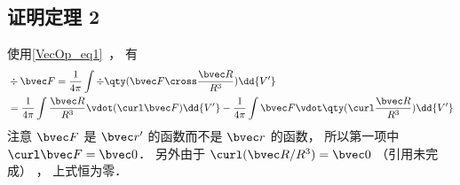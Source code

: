 \subsection{证明定理 2}
使用\autoref{VecOp_eq1}~， 有
\begin{equation}
\begin{aligned}
&\div \bvec F = \frac{1}{4\pi} \int \div \qty(\bvec F \cross \frac{\bvec R}{R^3}) \dd{V'}\\
&= \frac{1}{4\pi} \int \frac{\bvec R}{R^3} \vdot (\curl \bvec F)\dd{V'} - \frac{1}{4\pi} \int \bvec F \vdot \qty(\curl \frac{\bvec R}{R^3})\dd{V'}
\end{aligned}
\end{equation}
注意 $\bvec F$ 是 $\bvec r'$ 的函数而不是 $\bvec r$ 的函数， 所以第一项中 $\curl \bvec F = \bvec 0$． 另外由于 $\curl(\bvec R/R^3) = \bvec 0$ （引用未完成） ， 上式恒为零．
